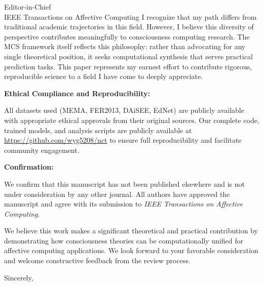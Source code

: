 \documentclass[11pt]{letter}
\begin{document}
\begin{letter}{Editor-in-Chief\\IEEE Transactions on Affective Computing}
I recognize that my path differs from traditional academic trajectories in this field. However, I believe this diversity of perspective contributes meaningfully to consciousness computing research. The MCS framework itself reflects this philosophy: rather than advocating for any single theoretical position, it seeks computational synthesis that serves practical prediction tasks. This paper represents my earnest effort to contribute rigorous, reproducible science to a field I have come to deeply appreciate.

\textbf{Ethical Compliance and Reproducibility:}

All datasets used (MEMA, FER2013, DAiSEE, EdNet) are publicly available with appropriate ethical approvals from their original sources. Our complete code, trained models, and analysis scripts are publicly available at \url{https://github.com/wyg5208/nct} to ensure full reproducibility and facilitate community engagement.

\textbf{Confirmation:}

We confirm that this manuscript has not been published elsewhere and is not under consideration by any other journal. All authors have approved the manuscript and agree with its submission to \textit{IEEE Transactions on Affective Computing}.

We believe this work makes a significant theoretical and practical contribution by demonstrating how consciousness theories can be computationally unified for affective computing applications. We look forward to your favorable consideration and welcome constructive feedback from the review process.

\closing{Sincerely,}

\end{letter}
\end{document}
